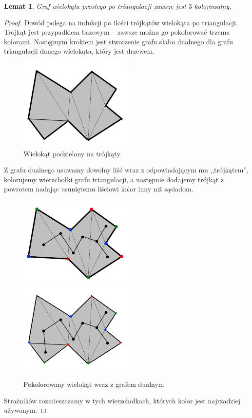 \documentclass[brudnopis]{xmgr}
\newtheorem{Lemat}{Lemat} \theoremstyle{definition}
\begin{document}
\begin{Lemat}
Graf wielokąta prostego po triangulacji zawsze jest $3$-kolorowalny.
\end{Lemat}
\begin{proof}
	Dowód polega na indukcji po ilości trójkątów wielokąta po triangulacji. Trójkąt jest przypadkiem bazowym -- zawsze można go pokolorować trzema kolorami. Następnym krokiem jest stworzenie grafu słabo dualnego dla grafu triangulacji danego wielokąta, który jest drzewem.
	\begin{figure}[ht!]
	  \centering
	  \includegraphics{rysunki/dual.png}
	    \caption{Wielokąt podzielony na trójkąty}
	\end{figure} 
	Z grafu dualnego usuwamy dowolny liść wraz z odpowiadającym mu ,,trójkątem'', kolorujemy wierzchołki grafu triangulacji, a następnie dodajemy trójkąt z powrotem nadając usuniętemu liściowi kolor inny niż sąsiadom.
	\begin{figure}[ht!]
	  \centering
	    \includegraphics{rysunki/dual_kolor.png} 
	    \includegraphics{rysunki/dual_caly_kolor.png}
	    \caption{Pokolorowany wielokąt wraz z grafem dualnym}
	\end{figure} 
	Strażników rozmieszczamy w tych wierzchołkach, których kolor jest najrzadziej używanym.
\end{proof}
\end{document}
